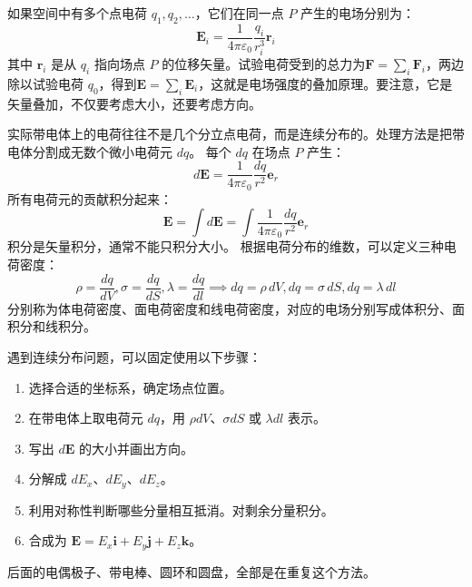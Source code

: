 \documentclass[lang=cn,11pt]{elegantbook}
\begin{document}
\begin{theorem}[电场强度的叠加原理]
如果空间中有多个点电荷 \(q_1,q_2,\ldots\)，它们在同一点 \(P\) 产生的电场分别为：
\[
\mathbf E_i=
\frac{1}{4\pi\varepsilon_0}
\frac{q_i}{r_i^3}\mathbf r_i
\]其中 \(\mathbf r_i\) 是从 \(q_i\) 指向场点 \(P\) 的位移矢量。试验电荷受到的总力为\(\mathbf F=\sum_i\mathbf F_i\)，两边除以试验电荷 \(q_0\)，得到\(\mathbf E=\sum_i\mathbf E_i\)，这就是电场强度的叠加原理。要注意，它是矢量叠加，不仅要考虑大小，还要考虑方向。
\end{theorem}

\begin{theorem}[连续电荷分布]
实际带电体上的电荷往往不是几个分立点电荷，而是连续分布的。处理方法是把带电体分割成无数个微小电荷元 \(dq\)。
每个 \(dq\) 在场点 \(P\) 产生：
\[
d\mathbf E=
\frac{1}{4\pi\varepsilon_0}
\frac{dq}{r^2}\mathbf e_r
\]所有电荷元的贡献积分起来：
\[
\boxed{\mathbf E=\int d\mathbf E
=\int\frac{1}{4\pi\varepsilon_0}
\frac{dq}{r^2}\mathbf e_r}
\]积分是矢量积分，通常不能只积分大小。
根据电荷分布的维数，可以定义三种电荷密度：
\[
\rho=\frac{dq}{dV},
\sigma=\frac{dq}{dS},
\lambda=\frac{dq}{dl}\implies dq=\rho\,dV, dq=\sigma\,dS, dq=\lambda\,dl
\]分别称为体电荷密度、面电荷密度和线电荷密度，对应的电场分别写成体积分、面积分和线积分。
\end{theorem}

\begin{note}
遇到连续分布问题，可以固定使用以下步骤：
\begin{enumerate}
  \item 选择合适的坐标系，确定场点位置。
  \item 在带电体上取电荷元 \(dq\)，用 \(\rho dV\)、\(\sigma dS\) 或 \(\lambda dl\) 表示。
  \item 写出 \(d\mathbf E\) 的大小并画出方向。
  \item 分解成 \(dE_x、dE_y、dE_z\)。
  \item 利用对称性判断哪些分量相互抵消。对剩余分量积分。
  \item 合成为 \(\mathbf E=E_x\mathbf i+E_y\mathbf j+E_z\mathbf k\)。
\end{enumerate}
后面的电偶极子、带电棒、圆环和圆盘，全部是在重复这个方法。
\end{note}
\end{document}
